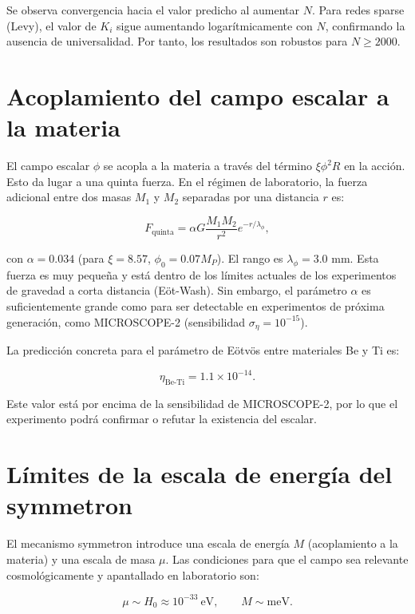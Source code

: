 \documentclass[12pt, a4paper]{article}
\theoremstyle{miuThm}
\theoremstyle{remark}
\begin{document}
Se observa convergencia hacia el valor predicho al aumentar $N$. Para redes sparse (Levy), el valor de $K_i$ sigue aumentando logarítmicamente con $N$, confirmando la ausencia de universalidad. Por tanto, los resultados son robustos para $N \ge 2000$.

\clearpage
\section{Acoplamiento del campo escalar a la materia}

El campo escalar $\phi$ se acopla a la materia a través del término $\xi \phi^2 R$ en la acción. Esto da lugar a una quinta fuerza. En el régimen de laboratorio, la fuerza adicional entre dos masas $M_1$ y $M_2$ separadas por una distancia $r$ es:

\begin{equation}
F_{\text{quinta}} = \alpha G \frac{M_1 M_2}{r^2} e^{-r/\lambda_\phi},
\end{equation}

con $\alpha = 0.034$ (para $\xi=8.57$, $\phi_0=0.07 M_P$). El rango es $\lambda_\phi = 3.0$ mm. Esta fuerza es muy pequeña y está dentro de los límites actuales de los experimentos de gravedad a corta distancia (Eöt-Wash). Sin embargo, el parámetro $\alpha$ es suficientemente grande como para ser detectable en experimentos de próxima generación, como MICROSCOPE-2 (sensibilidad $\sigma_\eta = 10^{-15}$). 

La predicción concreta para el parámetro de Eötvös entre materiales Be y Ti es:

\begin{equation}
\eta_{\text{Be-Ti}} = 1.1\times10^{-14}.
\end{equation}

Este valor está por encima de la sensibilidad de MICROSCOPE-2, por lo que el experimento podrá confirmar o refutar la existencia del escalar.

\clearpage
\section{Límites de la escala de energía del symmetron}

El mecanismo symmetron introduce una escala de energía $M$ (acoplamiento a la materia) y una escala de masa $\mu$. Las condiciones para que el campo sea relevante cosmológicamente y apantallado en laboratorio son:

\begin{equation}
\mu \sim H_0 \approx 10^{-33}\ \text{eV}, \qquad M \sim \text{meV}.
\end{equation}
\end{document}
